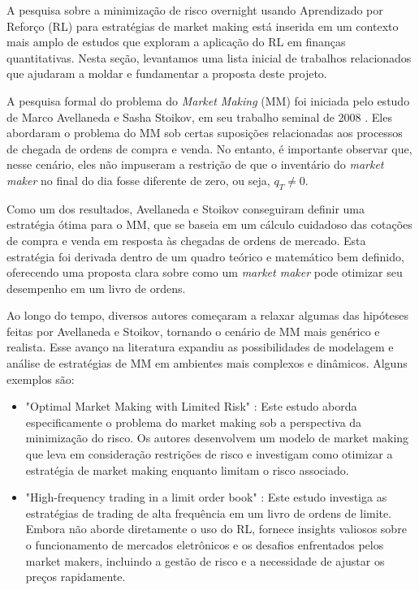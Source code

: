 A pesquisa sobre a minimização de risco overnight usando Aprendizado por Reforço (RL) para estratégias de market making está inserida em um contexto mais amplo de estudos que exploram a aplicação do RL em finanças quantitativas. Nesta seção, levantamos uma lista inicial de trabalhos relacionados que ajudaram a moldar e fundamentar a proposta deste projeto.

A pesquisa formal do problema do \textit{Market Making} (MM) foi iniciada pelo estudo de  Marco Avellaneda e Sasha Stoikov, em seu trabalho seminal de 2008 \citep{Avellaneda2008}. Eles abordaram o problema do MM sob certas suposições relacionadas aos processos de chegada de ordens de compra e venda. No entanto, é importante observar que, nesse cenário, eles não impuseram a restrição de que o inventário do \textit{market maker} no final do dia fosse diferente de zero, ou seja, $q_T \neq 0$.

Como um dos resultados, Avellaneda e Stoikov conseguiram definir uma estratégia ótima para o MM, que se baseia em um cálculo cuidadoso das cotações de compra e venda em resposta às chegadas de ordens de mercado. Esta estratégia foi derivada dentro de um quadro teórico e matemático bem definido, oferecendo uma proposta clara sobre como um \textit{market maker} pode otimizar seu desempenho em um livro de ordens.

Ao longo do tempo, diversos autores começaram a relaxar algumas das hipóteses feitas por Avellaneda e Stoikov, tornando o cenário de MM mais genérico e realista. Esse avanço na literatura expandiu as possibilidades de modelagem e análise de estratégias de MM em ambientes mais complexos e dinâmicos. Alguns exemplos são:
\begin{itemize}
    \item "Optimal Market Making with Limited Risk" \citep{Gueant2017}: Este estudo aborda especificamente o problema do market making sob a perspectiva da minimização do risco. Os autores desenvolvem um modelo de market making que leva em consideração restrições de risco e investigam como otimizar a estratégia de market making enquanto limitam o risco associado.
    \item "High-frequency trading in a limit order book" \citep{Avellaneda2008}: Este estudo investiga as estratégias de trading de alta frequência em um livro de ordens de limite. Embora não aborde diretamente o uso do RL, fornece insights valiosos sobre o funcionamento de mercados eletrônicos e os desafios enfrentados pelos market makers, incluindo a gestão de risco e a necessidade de ajustar os preços rapidamente.
\end{itemize}


